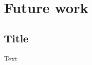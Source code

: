 
\chapter{Future work}  %

\ifpdf
    \graphicspath{{Chapters/Chapter6/Figs/Raster/}{Chapters/Chapter6/Figs/PDF/}{Chapters/Chapter6/Figs/}}
\else
    \graphicspath{{Chapters/Chapter6/Figs/Vector/}{Chapters/Chapter6/Figs/}}
\fi


\section{Title}
Text